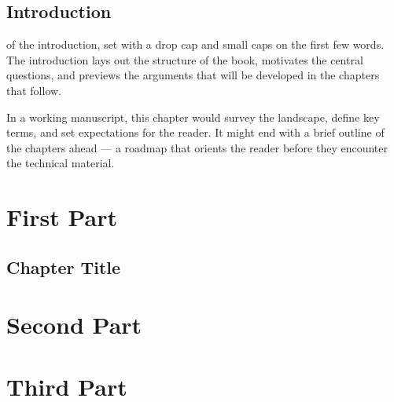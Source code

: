 \documentclass[12pt,twoside,b5paper]{book}
\begin{document}
\chapter{Introduction}
of the introduction, set with a drop cap and small caps on the first few words. The introduction lays out the structure of the book, motivates the central questions, and previews the arguments that will be developed in the chapters that follow.

In a working manuscript, this chapter would survey the landscape, define key terms, and set expectations for the reader. It might end with a brief outline of the chapters ahead --- a roadmap that orients the reader before they encounter the technical material.


\part{First Part}

\chapter{Chapter Title}



\part{Second Part}


\part{Third Part}


\backmatter

\printbibliography

\end{document}
